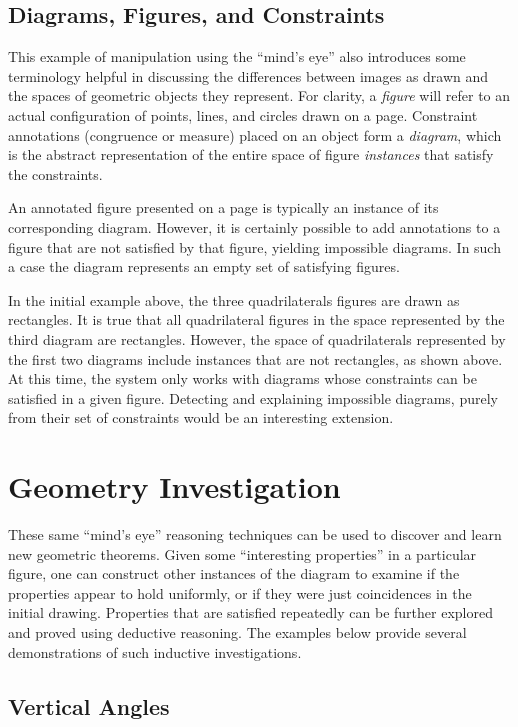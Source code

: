 \subsection{Diagrams, Figures, and Constraints}

This example of manipulation using the ``mind's eye'' also introduces
some terminology helpful in discussing the differences between images
as drawn and the spaces of geometric objects they represent.  For
clarity, a \emph{figure} will refer to an actual configuration of
points, lines, and circles drawn on a page.  Constraint annotations
(congruence or measure) placed on an object form a \emph{diagram},
which is the abstract representation of the entire space of figure
\emph{instances} that satisfy the constraints.

An annotated figure presented on a page is typically an instance of
its corresponding diagram.  However, it is certainly possible to add
annotations to a figure that are not satisfied by that figure,
yielding impossible diagrams.  In such a case the diagram represents
an empty set of satisfying figures.

In the initial example above, the three quadrilaterals figures are
drawn as rectangles.  It is true that all quadrilateral figures in the
space represented by the third diagram are rectangles.  However, the
space of quadrilaterals represented by the first two diagrams include
instances that are not rectangles, as shown above.  At this time, the
system only works with diagrams whose constraints can be satisfied in
a given figure.  Detecting and explaining impossible diagrams, purely
from their set of constraints would be an interesting extension.

\newpage
\section{Geometry Investigation}

These same ``mind's eye'' reasoning techniques can be used to discover
and learn new geometric theorems.  Given some ``interesting
properties'' in a particular figure, one can construct other instances
of the diagram to examine if the properties appear to hold uniformly,
or if they were just coincidences in the initial drawing.  Properties
that are satisfied repeatedly can be further explored and proved using
deductive reasoning.  The examples below provide several
demonstrations of such inductive investigations.

\subsection{Vertical Angles}

